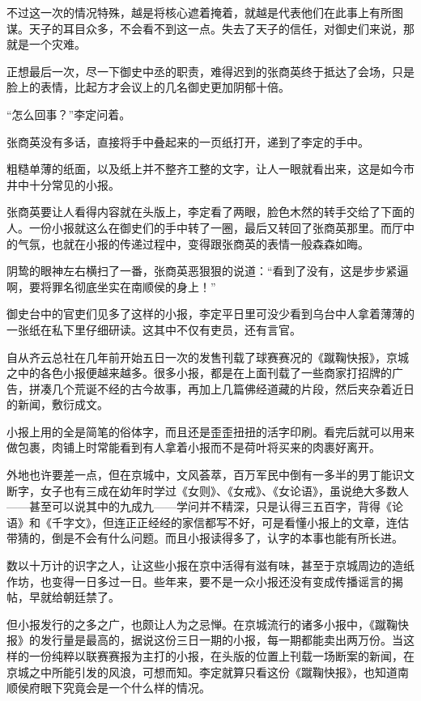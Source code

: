 不过这一次的情况特殊，越是将核心遮着掩着，就越是代表他们在此事上有所图谋。天子的耳目众多，不会看不到这一点。失去了天子的信任，对御史们来说，那就是一个灾难。

正想最后一次，尽一下御史中丞的职责，难得迟到的张商英终于抵达了会场，只是脸上的表情，比起方才会议上的几名御史更加阴郁十倍。

“怎么回事？”李定问着。

张商英没有多话，直接将手中叠起来的一页纸打开，递到了李定的手中。

粗糙单薄的纸面，以及纸上并不整齐工整的文字，让人一眼就看出来，这是如今市井中十分常见的小报。

张商英要让人看得内容就在头版上，李定看了两眼，脸色木然的转手交给了下面的人。一份小报就这么在御史们的手中转了一圈，最后又转回了张商英那里。而厅中的气氛，也就在小报的传递过程中，变得跟张商英的表情一般森森如晦。

阴鸷的眼神左右横扫了一番，张商英恶狠狠的说道：“看到了没有，这是步步紧逼啊，要将罪名彻底坐实在南顺侯的身上！”

御史台中的官吏们见多了这样的小报，李定平日里可没少看到乌台中人拿着薄薄的一张纸在私下里仔细研读。这其中不仅有吏员，还有言官。

自从齐云总社在几年前开始五日一次的发售刊载了球赛赛况的《蹴鞠快报》，京城之中的各色小报便越来越多。很多小报，都是在上面刊载了一些商家打招牌的广告，拼凑几个荒诞不经的古今故事，再加上几篇佛经道藏的片段，然后夹杂着近日的新闻，敷衍成文。

小报上用的全是简笔的俗体字，而且还是歪歪扭扭的活字印刷。看完后就可以用来做包裹，肉铺上时常能看到有人拿着小报而不是荷叶将买来的肉裹好离开。

外地也许要差一点，但在京城中，文风荟萃，百万军民中倒有一多半的男丁能识文断字，女子也有三成在幼年时学过《女则》、《女戒》、《女论语》，虽说绝大多数人——甚至可以说其中的九成九——学问并不精深，只是认得三五百字，背得《论语》和《千字文》，但连正正经经的家信都写不好，可是看懂小报上的文章，连估带猜的，倒是不会有什么问题。而且小报读得多了，认字的本事也能有所长进。

数以十万计的识字之人，让这些小报在京中活得有滋有味，甚至于京城周边的造纸作坊，也变得一日多过一日。些年来，要不是一众小报还没有变成传播谣言的揭帖，早就给朝廷禁了。

但小报发行的之多之广，也颇让人为之忌惮。在京城流行的诸多小报中，《蹴鞠快报》的发行量是最高的，据说这份三日一期的小报，每一期都能卖出两万份。当这样的一份纯粹以联赛赛报为主打的小报，在头版的位置上刊载一场断案的新闻，在京城之中所能引发的风浪，可想而知。李定就算只看这份《蹴鞠快报》，也知道南顺侯府眼下究竟会是一个什么样的情况。


